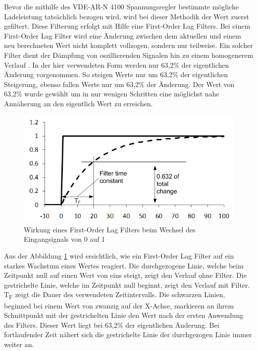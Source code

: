 Bevor die mithilfe des VDE-AR-N 4100 Spannungsregler bestimmte mögliche Ladeleistung tatsächlich bezogen wird, wird bei dieser Methodik der Wert zuerst gefiltert. Diese Filterung erfolgt mit Hilfe eine First-Order Lag Filters. Bei einem First-Order Lag Filter wird eine Änderung zwischen dem aktuellen und einem neu berechneten Wert nicht komplett vollzogen, sondern nur teilweise. Ein solcher Filter dient der Dämpfung von oszillierenden Signalen hin zu einem homogenerem Verlauf . In der hier verwendeten Form werden nur 63,2\% der eigentlichen Änderung vorgenommen. So steigen Werte nur um 63,2\% der eigentlichen Steigerung, ebenso fallen Werte nur um 63,2\% der Änderung. Der Wert von 63,2\% wurde gewählt um in nur wenigen Schritten eine möglichst nahe Annäherung an den eigentlich Wert zu erreichen.
\begin{figure}[htb]
	\includegraphics[scale=0.75]{img/lag_Filter.png}
	\caption{Wirkung eines First-Order Lag Filters beim Wechsel des \newline Eingangsignals von 0 auf 1}
	\label{Abb_lag_filter}
\end{figure}

Aus der Abbildung \ref{Abb_lag_filter} wird ersichtlich, wie ein First-Order Lag Filter auf ein starkes Wachstum eines Wertes reagiert. Die durchgezogene Linie, welche beim Zeitpunkt null auf einen Wert von eins steigt, zeigt den Verlauf ohne Filter. Die gestrichelte Linie, welche im Zeitpunkt null beginnt, zeigt den Verlauf mit Filter. T\textsubscript{F} zeigt die Dauer des verwendeten Zeitintervalls. Die schwarzen Linien, beginned bei einem Wert von zwanzig auf der X-Achse, markieren an ihrem Schnittpunkt  mit der gestrichelten Linie den Wert nach der ersten Anwendung des Filters. Dieser Wert liegt bei 63,2\% der eigentlichen Änderung. Bei fortlaufender Zeit nähert sich die gestrichelte Linie der durchgezogen Linie immer weiter an.


